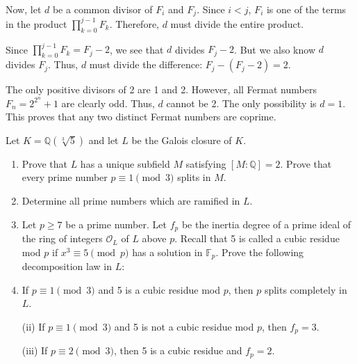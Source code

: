 \begin{solution}
Now, let $d$ be a common divisor of $F_i$ and $F_j$. Since $i < j$, $F_i$ is one of the terms in the product $\prod_{k=0}^{j-1} F_k$. Therefore, $d$ must divide the entire product.

\bigskip

Since $\prod_{k=0}^{j-1} F_k = F_j - 2$, we see that $d$ divides $F_j - 2$. But we also know $d$ divides $F_j$. Thus, $d$ must divide the difference: $F_j - (F_j - 2) = 2$.

\bigskip

The only positive divisors of 2 are 1 and 2. However, all Fermat numbers $F_n = 2^{2^n} + 1$ are clearly odd. Thus, $d$ cannot be 2. The only possibility is $d=1$. This proves that any two distinct Fermat numbers are coprime.
\end{solution}

\begin{exercise}
\label{algebra:2018:2}
Let $K = \mathbb{Q}(\sqrt[3]{5})$ and let $L$ be the Galois closure of $K$.

\begin{enumerate}
\item Prove that $L$ has a unique subfield $M$ satisfying $[M: \mathbb{Q}] = 2$. Prove that every prime number $p \equiv 1 \pmod{3}$ splits in $M$.

\item Determine all prime numbers which are ramified in $L$.

\item Let $p \geq 7$ be a prime number. Let $f_p$ be the inertia degree of a prime ideal of the ring of integers $\mathcal{O}_L$ of $L$ above $p$. Recall that 5 is called a cubic residue mod $p$ if $x^3 \equiv 5 \pmod{p}$ has a solution in $\mathbb{F}_p$. Prove the following decomposition law in $L$:

\item If $p \equiv 1 \pmod{3}$ and 5 is a cubic residue mod $p$, then $p$ splits completely in $L$.

(ii) If $p \equiv 1 \pmod{3}$ and 5 is not a cubic residue mod $p$, then $f_p = 3$.

(iii) If $p \equiv 2 \pmod{3}$, then 5 is a cubic residue and $f_p = 2$.
\end{enumerate}
\end{exercise}
